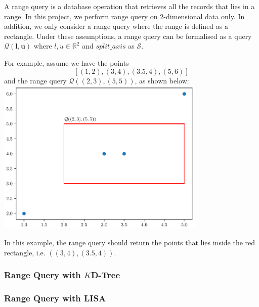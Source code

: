 A range query is a database operation that retrieves all the records that lies in a range. In this project, we perform range query on $2$-dimensional data only. In addition, we only consider a range query where the range is defined as a rectangle. Under these assumptions, a range query can be formalised as a query $\mathcal{Q}(\boldsymbol{l}, \boldsymbol{u})$ where $l,u\in\mathbb{R}^2$ and $split\_axis$ as $\mathcal{S}$.

\begin{mscexample}
	For example, assume we have the points
	$$
	[(1,2), (3,4), (3.5, 4), (5,6)]
	$$
	and the range query $\mathcal{Q}((2,3), (5,5))$, as shown below:
	\centering
   	\includegraphics[width=10cm]{graphs/implementation/queries/range_query.pdf}
   	\label{fig:range_query_demo}
	
In this example, the range query should return the points that lies inside the red rectangle, i.e. $((3,4), (3.5, 4))$.
\end{mscexample}

\subsubsection{Range Query with $K$D-Tree}



\subsubsection{Range Query with LISA}

